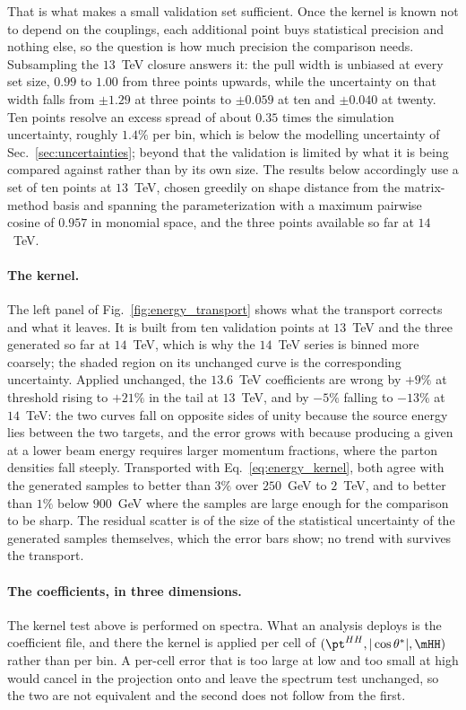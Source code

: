 That is what makes a small validation set sufficient. Once the kernel is known not to
depend on the couplings, each additional point buys statistical precision and nothing
else, so the question is how much precision the comparison needs. Subsampling the $13$~TeV
closure answers it: the pull width is unbiased at every set size, $0.99$ to $1.00$ from
three points upwards, while the uncertainty on that width falls from $\pm 1.29$ at three
points to $\pm 0.059$ at ten and $\pm 0.040$ at twenty. Ten points resolve an excess
spread of about $0.35$ times the simulation uncertainty, roughly $1.4\%$ per bin, which
is below the modelling uncertainty of Sec.~\ref{sec:uncertainties}; beyond that the
validation is limited by what it is being compared against rather than by its own size.
The results below accordingly use a set of ten points at $13$~TeV, chosen greedily on
\mHH shape distance from the matrix-method basis and spanning the parameterization with a
maximum pairwise cosine of $0.957$ in monomial space, and the three points available so
far at $14$~TeV.

\paragraph{The kernel.}
The left panel of Fig.~\ref{fig:energy_transport} shows what the transport corrects and
what it leaves. It is built from ten validation points at $13$~TeV and the three
generated so far at $14$~TeV, which is why the $14$~TeV series is binned more coarsely;
the shaded region on its unchanged curve is the corresponding uncertainty.
Applied unchanged, the $13.6$~TeV coefficients are wrong by $+9\%$ at threshold rising to
$+21\%$ in the tail at $13$~TeV, and by $-5\%$ falling to $-13\%$ at $14$~TeV: the two
curves fall on opposite sides of unity because the source energy lies between the two
targets, and the error grows with \mHH because producing a given \mHH at a lower beam
energy requires larger momentum fractions, where the parton densities fall steeply.
Transported with Eq.~\eqref{eq:energy_kernel}, both agree with the generated samples to
better than $3\%$ over $250$~GeV to $2$~TeV, and to better than $1\%$ below $900$~GeV
where the samples are large enough for the comparison to be sharp. The residual scatter
is of the size of the statistical uncertainty of the generated samples themselves, which
the error bars show; no trend with \mHH survives the transport.

\paragraph{The coefficients, in three dimensions.}
The kernel test above is performed on \mHH spectra. What an analysis deploys is the
coefficient file, and there the kernel is applied per cell of
$(\pt^{HH}, |\cos\theta^*|, \mHH)$ rather than per \mHH bin. A per-cell error that is too
large at low \pt and too small at high would cancel in the projection onto \mHH and leave
the spectrum test unchanged, so the two are not equivalent and the second does not follow
from the first.

